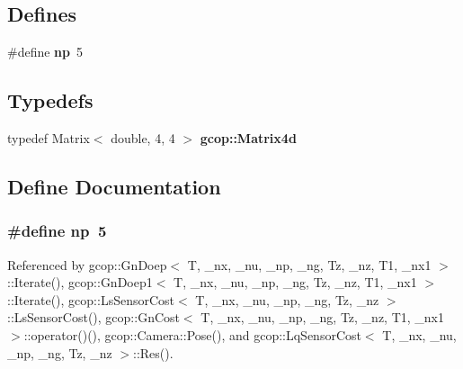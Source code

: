 \subsection*{\-Defines}
\begin{DoxyCompactItemize}
\item 
\#define {\bf np}~5
\end{DoxyCompactItemize}
\subsection*{\-Typedefs}
\begin{DoxyCompactItemize}
\item 
typedef \-Matrix$<$ double, 4, 4 $>$ {\bf gcop\-::\-Matrix4d}
\end{DoxyCompactItemize}


\subsection{\-Define \-Documentation}
\subsubsection[{np}]{\setlength{\rightskip}{0pt plus 5cm}\#define {\bf np}~5}\label{camera_8h_a2bae77253fba36eb9bf93d4c45e4ff79}


\-Referenced by gcop\-::\-Gn\-Doep$<$ T, \-\_\-nx, \-\_\-nu, \-\_\-np, \-\_\-ng, Tz, \-\_\-nz, T1, \-\_\-nx1 $>$\-::\-Iterate(), gcop\-::\-Gn\-Doep1$<$ T, \-\_\-nx, \-\_\-nu, \-\_\-np, \-\_\-ng, Tz, \-\_\-nz, T1, \-\_\-nx1 $>$\-::\-Iterate(), gcop\-::\-Ls\-Sensor\-Cost$<$ T, \-\_\-nx, \-\_\-nu, \-\_\-np, \-\_\-ng, Tz, \-\_\-nz $>$\-::\-Ls\-Sensor\-Cost(), gcop\-::\-Gn\-Cost$<$ T, \-\_\-nx, \-\_\-nu, \-\_\-np, \-\_\-ng, Tz, \-\_\-nz, T1, \-\_\-nx1 $>$\-::operator()(), gcop\-::\-Camera\-::\-Pose(), and gcop\-::\-Lq\-Sensor\-Cost$<$ T, \-\_\-nx, \-\_\-nu, \-\_\-np, \-\_\-ng, Tz, \-\_\-nz $>$\-::\-Res().

